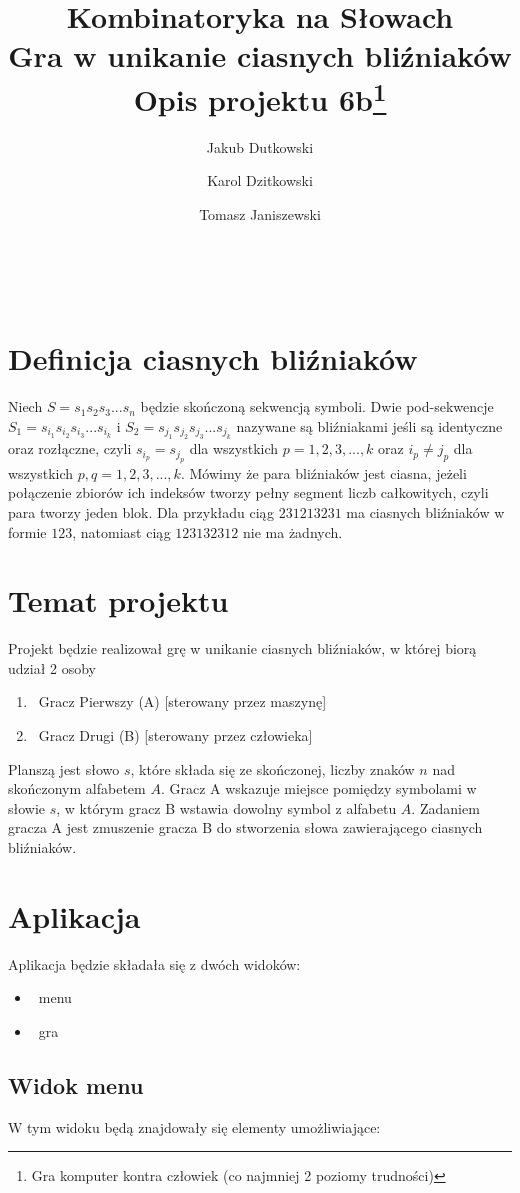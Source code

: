 \documentclass[11pt,a4paper]{article}
\author{Jakub Dutkowski}
\author{Karol Dzitkowski}
\author{Tomasz Janiszewski}
\affil{Wydział Matematyki i Nauk Informacyjnych, Politechnika Warszawska}
\title{
	Kombinatoryka na Słowach\\
	Gra w unikanie ciasnych bliźniaków\\
	Opis projektu
	6b\footnote{Gra komputer kontra człowiek (co najmniej 2 poziomy trudności)}
 }
\begin{document}
\maketitle\
\newpage\


\section{Definicja ciasnych bliźniaków}
Niech $S = s_1 s_2 s_3 ... s_n$ będzie skończoną sekwencją symboli. Dwie pod-sekwencje
$S_1 = s_{i_1} s_{i_2} s_{i_3} ... s_{i_k}$ i $S_2 = s_{j_1} s_{j_2} s_{j_3} ... s_{j_k}$
nazywane są bliźniakami jeśli są identyczne oraz rozłączne, czyli $s_{i_p} = s_{j_p}$ dla 
wszystkich $p = {1, 2, 3, ..., k}$ oraz $ i_p \neq j_p $ dla wszystkich $ p,q = {1, 2, 3, ..., k}$.
Mówimy że para bliźniaków jest ciasna, jeżeli połączenie zbiorów ich indeksów tworzy pełny segment
liczb całkowitych, czyli para tworzy jeden blok. Dla przykładu ciąg $231213231$ ma ciasnych bliźniaków
w formie $123$, natomiast ciąg $123132312$ nie ma żadnych.

\section{Temat projektu}
Projekt będzie realizował grę w unikanie ciasnych bliźniaków,
w której biorą udział 2 osoby 
\begin{enumerate}
	\item\ Gracz Pierwszy (A) [sterowany przez maszynę]
	\item\ Gracz Drugi (B) [sterowany przez człowieka]
\end{enumerate}
Planszą jest słowo $s$, które składa się ze skończonej,
liczby znaków $n$ nad skończonym alfabetem $A$.
Gracz A wskazuje miejsce pomiędzy symbolami w słowie $s$, w którym gracz B
wstawia dowolny symbol z alfabetu $A$.
Zadaniem gracza A jest zmuszenie gracza B do stworzenia 
słowa zawierającego ciasnych bliźniaków.

\section{Aplikacja}
Aplikacja będzie składała się z dwóch widoków:
\begin{itemize}
 \item\ menu
 \item\ gra
\end{itemize}

\subsection{Widok menu}
W tym widoku będą znajdowały się elementy umożliwiające:
\end{document}

